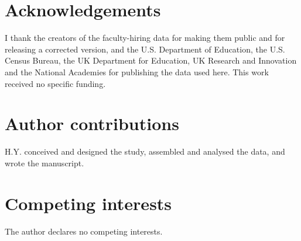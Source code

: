 \documentclass[11pt]{article}
\begin{document}



\section*{Acknowledgements}
I thank the creators of the faculty-hiring data for making them public and for releasing a corrected version, and the
U.S. Department of Education, the U.S. Census Bureau, the UK Department for Education, UK Research and Innovation
and the National Academies for publishing the data used here. This work received no specific funding.

\section*{Author contributions}
H.Y. conceived and designed the study, assembled and analysed the data, and wrote the manuscript.

\section*{Competing interests}
The author declares no competing interests.
\end{document}
